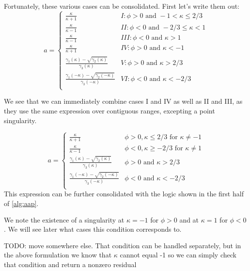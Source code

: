 \documentclass{article}
\begin{document}
Fortunately, these various cases can be consolidated.  First let's write them out:
\begin{equation}
    a =
    \begin{cases}
        \frac{\kappa}{\kappa + 1} & I: \phi > 0 \text{ and } -1 < \kappa \le 2/3 \\
        \frac{\kappa}{\kappa - 1} & II: \phi < 0 \text{ and } -2/3 \le \kappa < 1 \\
        \frac{\kappa}{\kappa - 1} & III: \phi < 0 \text{ and } \kappa > 1 \\
        \frac{\kappa}{\kappa + 1} & IV: \phi > 0 \text{ and } \kappa < -1 \\
        \frac{\gamma_1(\kappa) - \sqrt{\gamma_2(\kappa)}}{\gamma_3(\kappa)} & V: \phi > 0 \text{ and } \kappa > 2/3 \\
        \frac{\gamma_1(-\kappa) - \sqrt{\gamma_2(-\kappa)}}{\gamma_3(-\kappa)} & VI: \phi < 0 \text{ and } \kappa < -2/3 \\
    \end{cases}
\end{equation}

We see that we can immediately combine cases I and IV as well as II and III, as they use the same expression over contiguous ranges, excepting a point singularity.

\begin{equation}
    a =
    \begin{cases}
        \frac{\kappa}{\kappa + 1} & \phi > 0, \kappa \le 2/3 \text{ for } \kappa \ne -1\\
        \frac{\kappa}{\kappa - 1} & \phi < 0, \kappa \ge -2/3 \text{ for } \kappa \ne 1\\
        \frac{\gamma_1(\kappa) - \sqrt{\gamma_2(\kappa)}}{\gamma_3(\kappa)} & \phi > 0 \text{ and } \kappa > 2/3 \\
        \frac{\gamma_1(-\kappa) - \sqrt{\gamma_2(-\kappa)}}{\gamma_3(-\kappa)} & \phi < 0 \text{ and } \kappa < -2/3 \\
    \end{cases}
    \label{eq:asing}
\end{equation}
This expression can be further consolidated with the logic shown in the first half of \cref{alg:aap}.


We note the existence of a singularity at $\kappa = -1$ for $\phi > 0$ and at $\kappa = 1$ for $\phi < 0$.  We will see later what cases this condition corresponds to.

TODO: move somewhere else.  That condition can be handled separately, but in the above formulation we know that $\kappa$ cannot equal -1 so we can simply check that condition and return a nonzero residual
\end{document}
